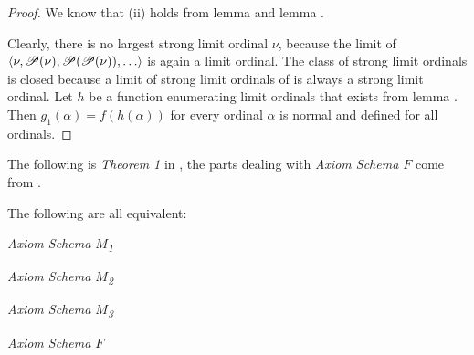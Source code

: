 \begin{proof}
We know that (ii) holds from lemma  and lemma .

Clearly, there is no largest strong limit ordinal $\nu$, because the limit of $\langle \nu, \mathscr{P} (\nu), \mathscr{P} (\mathscr{P} (\nu)), \ldots \rangle$ is again a limit ordinal. %
The class of strong limit ordinals is closed because a limit of strong limit ordinals of is always a strong limit ordinal.
Let $h$ be a function enumerating limit ordinals that exists from lemma .
Then $g_1(\alpha) = f(h(\alpha))$ for every ordinal $\alpha$ is normal and defined for all ordinals.
\end{proof}

The following is \emph{Theorem 1} in \cite{Levy60a}, the parts dealing with \emph{Axiom Schema $F$} come from \cite{DrakeBook}.

\begin{theorem}
The following are all equivalent:
\bce[(i)]
\item \emph{Axiom Schema $M$\textsubscript{1}}
\item \emph{Axiom Schema $M$\textsubscript{2}} 
\item \emph{Axiom Schema $M$\textsubscript{3}} 
\item \emph{Axiom Schema $F$}
\ece
\end{theorem}

